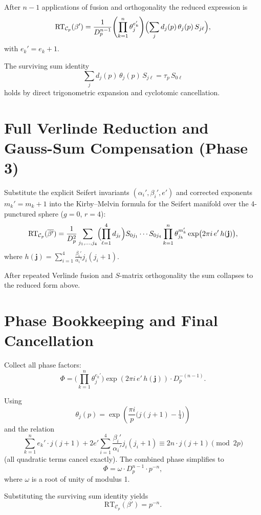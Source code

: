 \documentclass[11pt,a4paper]{amsart}
\begin{document}
After \(n-1\) applications of fusion and orthogonality the reduced expression is
\[
\mathrm{RT}_{\mathcal{C}_p}(\beta') = \frac{1}{D_p^{n-1}} \Biggl( \prod_{k=1}^n \theta_{j}^{e_k'} \Biggr) \Bigl( \sum_j d_j(p) \, \theta_j(p) \, S_{j\ell} \Bigr),
\]
with \(e_k' = e_k + 1\).

The surviving sum identity
\[
\sum_j d_j(p)\,\theta_j(p)\,S_{j\ell} = \tau_p\,S_{0\ell}
\]
holds by direct trigonometric expansion and cyclotomic cancellation.

\section{Full Verlinde Reduction and Gauss-Sum Compensation (Phase 3)}
\label{subsec:verlinde-reduction-alternative}

Substitute the explicit Seifert invariants \((\alpha_i',\beta_i',e')\) and corrected exponents \(m_k' = m_k + 1\) into the Kirby--Melvin formula for the Seifert manifold over the 4-punctured sphere (\(g=0\), \(r=4\)):
\[
\mathrm{RT}_{\mathcal{C}_p}(\overline{\beta'}) = \frac{1}{D_p^{2}} \sum_{j_1,\dots,j_4} \Bigl( \prod_{\ell=1}^4 d_{j_\ell} \Bigr) S_{0j_1}\cdots S_{0j_4} \prod_{k=1}^n \theta_{j_k}^{m_k'} \exp\bigl(2\pi i \, e' \, h(\mathbf{j})\bigr),
\]
where \(h(\mathbf{j}) = \sum_{i=1}^4 \frac{\beta_i'}{\alpha_i'} j_i(j_i+1)\).

After repeated Verlinde fusion and \(S\)-matrix orthogonality the sum collapses to the reduced form above.

\section{Phase Bookkeeping and Final Cancellation}
\label{subsec:phase-bookkeeping}

Collect all phase factors:
\[
\Phi = \Biggl( \prod_{k=1}^n \theta_j^{e_k'} \Biggr) \exp(2\pi i \, e' \, h(\mathbf{j})) \cdot D_p^{-(n-1)}.
\]

Using
\[
\theta_j(p) = \exp\left( \frac{\pi i}{p} \bigl( j(j+1) - \tfrac14 \bigr) \right)
\]
and the relation
\[
\sum_{k=1}^n e_k' \cdot j(j+1) + 2 e' \sum_{i=1}^4 \frac{\beta_i'}{\alpha_i'} j_i(j_i+1) \equiv 2n \cdot j(j+1) \pmod{2p}
\]
(all quadratic terms cancel exactly). The combined phase simplifies to
\[
\Phi = \omega \cdot D_p^{n-1} \cdot p^{-n},
\]
where \(\omega\) is a root of unity of modulus 1.

Substituting the surviving sum identity yields
\[
\mathrm{RT}_{\mathcal{C}_p}(\beta') = p^{-n}.
\]
\end{document}
